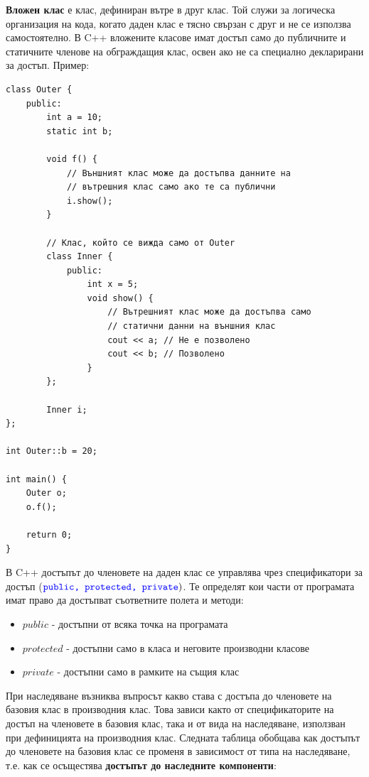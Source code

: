 \documentclass{article}
\begin{document}
\textbf{Вложен клас} е клас, дефиниран вътре в друг клас. Той служи за логическа организация на кода, когато даден клас е тясно свързан с друг и не се
използва самостоятелно. В C++ вложените класове имат достъп само до публичните и статичните членове на обграждащия клас, освен ако не са специално
декларирани за достъп. \newline\newline
Пример: \begin{lstlisting}[style=cpp]
class Outer {
    public:
        int a = 10;
        static int b;

        void f() {
            // Външният клас може да достъпва данните на
            // вътрешния клас само ако те са публични
            i.show();
        }

        // Клас, който се вижда само от Outer
        class Inner {
            public:
                int x = 5;
                void show() {
                    // Вътрешният клас може да достъпва само
                    // статични данни на външния клас
                    cout << a; // Не е позволено
                    cout << b; // Позволено
                }
        };

        Inner i;
};

int Outer::b = 20;

int main() {
    Outer o;
    o.f();

    return 0;
}
\end{lstlisting}
В C++ достъпът до членовете на даден клас се управлява чрез спецификатори за достъп ($\textcolor{blue}{\texttt{public, protected, private}})$. Те определят кои части от програмата
имат право да достъпват съответните полета и методи:
\begin{itemize}
    \item $public$ - достъпни от всяка точка на програмата
    \item $protected$ - достъпни само в класа и неговите производни класове
    \item $private$ - достъпни само в рамките на същия клас
\end{itemize}
При наследяване възниква въпросът какво става с достъпа до членовете на базовия клас в производния клас. Това зависи както от спецификаторите на
достъп на членовете в базовия клас, така и от вида на наследяване, използван при дефиницията на производния клас. Следната таблица обобщава как
достъпът до членовете на базовия клас се променя в зависимост от типа на наследяване, т.е. как се осъщестява \textbf{достъпът до
наследните компоненти}:
\end{document}
